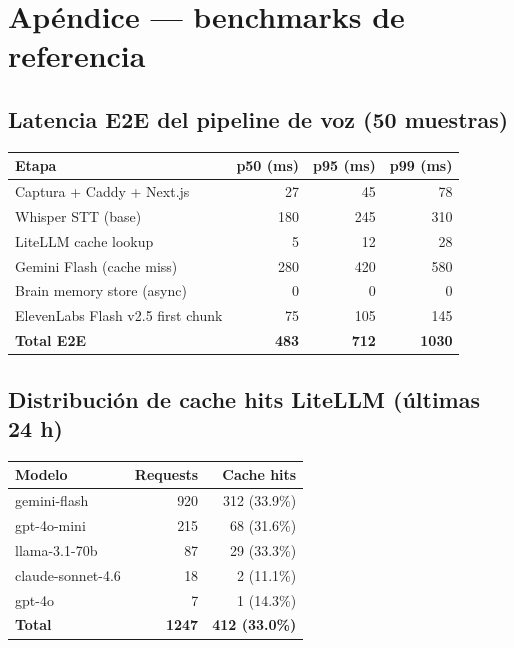 \documentclass[11pt,a4paper]{article}
\begin{document}
\newpage

\section{Apéndice — benchmarks de referencia}

\subsection{Latencia E2E del pipeline de voz (50 muestras)}

\begin{center}
\begin{tabular}{|l|r|r|r|}
\hline
\rowcolor{sotared}\color{white}\textbf{Etapa} & \color{white}\textbf{p50 (ms)} & \color{white}\textbf{p95 (ms)} & \color{white}\textbf{p99 (ms)}\\
\hline
Captura + Caddy + Next.js & 27 & 45 & 78\\
Whisper STT (base) & 180 & 245 & 310\\
LiteLLM cache lookup & 5 & 12 & 28\\
Gemini Flash (cache miss) & 280 & 420 & 580\\
Brain memory store (async) & 0 & 0 & 0\\
ElevenLabs Flash v2.5 first chunk & 75 & 105 & 145\\
\hline
\rowcolor{okbg}\textbf{Total E2E} & \textbf{483} & \textbf{712} & \textbf{1030}\\
\hline
\end{tabular}
\end{center}

\subsection{Distribución de cache hits LiteLLM (últimas 24 h)}

\begin{center}
\begin{tabular}{|l|r|r|}
\hline
\rowcolor{sotared}\color{white}\textbf{Modelo} & \color{white}\textbf{Requests} & \color{white}\textbf{Cache hits}\\
\hline
gemini-flash & 920 & 312 (33.9\%)\\
gpt-4o-mini & 215 & 68 (31.6\%)\\
llama-3.1-70b & 87 & 29 (33.3\%)\\
claude-sonnet-4.6 & 18 & 2 (11.1\%)\\
gpt-4o & 7 & 1 (14.3\%)\\
\hline
\rowcolor{okbg}\textbf{Total} & \textbf{1247} & \textbf{412 (33.0\%)}\\
\hline
\end{tabular}
\end{center}
\end{document}
